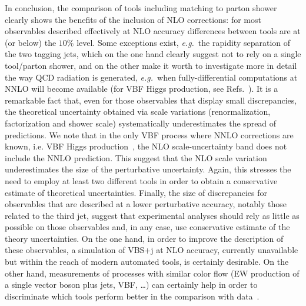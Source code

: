 \documentclass[twocolumn,epjc3]{svjour3} %
\begin{document}
In conclusion, the comparison of tools including matching to parton shower clearly shows the benefits of the inclusion of NLO corrections: for most observables described
effectively at NLO accuracy differences between tools are at (or below) the $10\%$ level.
Some exceptions exist, \emph{e.g.}\ the rapidity separation of the two tagging jets, which
on the one hand clearly suggest not to rely on a single tool/parton shower, and on the other make it worth to investigate more in detail the way QCD radiation is
generated, \emph{e.g.}\ when fully-differential computations at NNLO will become available (for VBF Higgs production, see Refs.~\cite{Cacciari:2015jma, Cruz-Martinez:2018rod}). It is a remarkable fact that, even for those observables that display small discrepancies,
the theoretical uncertainty obtained via scale variations (renormalization, factorization and shower scale) 
systematically underestimates the spread of predictions. We note 
that in the only VBF process where NNLO corrections are known, i.e. VBF Higgs production~\cite{Cacciari:2015jma, Cruz-Martinez:2018rod}, 
the NLO scale-uncertainty band does not include the NNLO prediction. This suggest that the NLO scale variation 
underestimates the size of the perturbative uncertainty. Again, this stresses the need
 to employ at least two different tools in order to obtain a conservative estimate of theoretical uncertainties. Finally, the size of discrepancies for observables that are described at a lower perturbative accuracy, notably those related to the third jet, suggest that
experimental analyses should rely as little as possible on those observables and, in any case, use conservative estimate of the theory
uncertainties. On the one hand, in order to improve the
description of these observables, a simulation of VBS+j at NLO accuracy, currently unavailable but within the reach of modern
automated tools, is certainly desirable.
On the other hand, measurements of processes with similar
color flow (EW production of a single vector boson plus jets,
VBF, \ldots) can certainly help in order to discriminate which tools perform better in the comparison with data~\cite{Aaboud:2017emo,Sirunyan:2017jej}.
\end{document}
